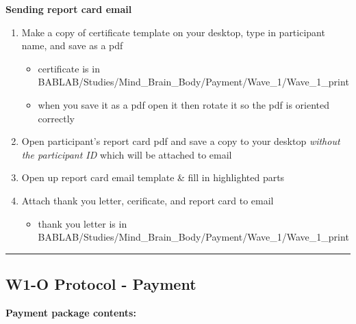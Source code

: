 \documentclass[
]{book}
\providecommand{\tightlist}{%
  \setlength{\itemsep}{0pt}\setlength{\parskip}{0pt}}
\begin{document}
\textbf{Sending report card email}

\begin{enumerate}
\def\labelenumi{\arabic{enumi}.}
\item
  Make a copy of certificate template on your desktop, type in participant name, and save as a pdf

  \begin{itemize}
  \tightlist
  \item
    certificate is in BABLAB/Studies/Mind\_Brain\_Body/Payment/Wave\_1/Wave\_1\_print
  \item
    when you save it as a pdf open it then rotate it so the pdf is oriented correctly
  \end{itemize}
\item
  Open participant's report card pdf and save a copy to your desktop \emph{without the participant ID} which will be attached to email
\item
  Open up report card email template \& fill in highlighted parts
\item
  Attach thank you letter, cerificate, and report card to email

  \begin{itemize}
  \tightlist
  \item
    thank you letter is in BABLAB/Studies/Mind\_Brain\_Body/Payment/Wave\_1/Wave\_1\_print
  \end{itemize}
\end{enumerate}

\begin{center}\rule{0.5\linewidth}{0.5pt}\end{center}

\hypertarget{w1-o-protocol---payment-1}{%
\subsection{W1-O Protocol - Payment}\label{w1-o-protocol---payment-1}}

\textbf{Payment package contents:}
\end{document}
